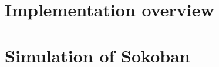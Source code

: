 \documentclass[master.tex]{subfiles}
\begin{document}
\section{Implementation overview}


%    

\section{Simulation of Sokoban}\label{sec:Impl:Results}
    
\end{document}
